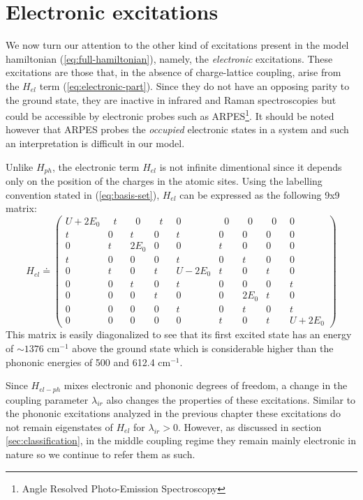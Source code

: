 \chapter{Electronic excitations}
\label{chap:electronic}

We now turn our attention to the other kind of excitations present in the model hamiltonian (\ref{eq:full-hamiltonian}), namely, the \textit{electronic} excitations.
These excitations are those that, in the absence of charge-lattice coupling, arise from the $H_{el}$ term (\ref{eq:electronic-part}).
Since they do not have an opposing parity to the ground state, they are inactive in infrared and Raman spectroscopies but could be accessible by electronic probes such as ARPES\footnote{Angle Resolved Photo-Emission Spectroscopy}.
It should be noted however that ARPES probes the \textit{occupied} electronic states in a system and such an interpretation is difficult in our model.

Unlike $H_{ph}$, the electronic term $H_{el}$ is not infinite dimentional since it depends only on the position of the charges in the atomic sites. 
Using the labelling convention stated in (\ref{eq:basis-set}), $H_{el}$ can be expressed as the following 9x9 matrix:
%
\begin{equation}\label{eq:Hel-matrix} 
  H_{el} \doteq
  \left( 
    \begin{array}{ccccccccc} 
      U+2E_0 &\;\;t\;\;&\;\;0\;\;&\;\;t\;\;&0&\;\;0\;\;&\;\;0\;\;&\;\;0\;\;&0 \\
      t&0&t&0&t&0&0&0&0 \\
      0&t&2E_0 &0&0&t&0&0&0 \\
      t&0&0&0&t&0&t&0&0 \\
      0&t&0&t&U-2E_0 &t&0&t&0 \\
      0&0&t&0&t&0&0&0&t \\
      0&0&0&t&0&0&2E_0 &t&0 \\
      0&0&0&0&t&0&t&0&t \\
      0&0&0&0&0&t&0&t&U+2E_0  
    \end{array} 
  \right)
\end{equation}
%
This matrix is easily diagonalized to see that its first excited state has an energy of $\sim 1376$ cm$^{-1}$ above the ground state which is considerable higher than the phononic energies of 500 and 612.4 cm$^{-1}$.

Since $H_{el-ph}$ mixes electronic and phononic degrees of freedom, a change in the coupling parameter $\lambda_{ir}$ also changes the properties of these excitations.
Similar to the phononic excitations analyzed in the previous chapter these excitations do not remain eigenstates of $H_{el}$ for $\lambda_{ir}>0$.
However, as discussed in section \ref{sec:classification}, in the middle coupling regime they remain mainly electronic in nature so we continue to refer them as such.

